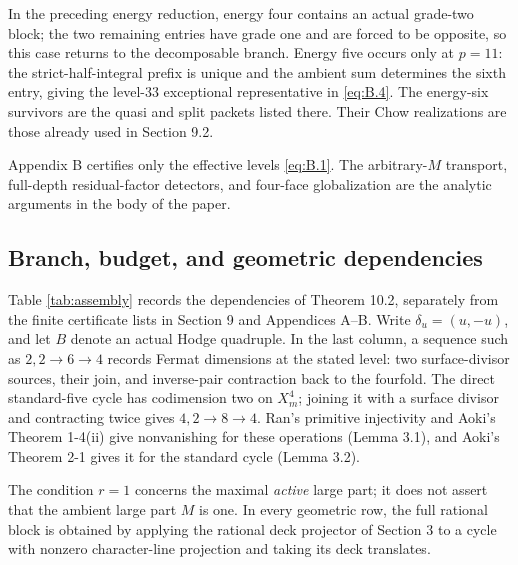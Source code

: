 \documentclass[11pt]{amsart}
\numberwithin{theorem}{section}
\theoremstyle{remark}
\numberwithin{equation}{section}
\begin{document}
In the preceding energy reduction, energy four contains an actual
grade-two block; the two remaining entries have grade one and are forced to
be opposite, so this case returns to the decomposable branch. Energy five
occurs only at \(p=11\): the strict-half-integral prefix is unique and the
ambient sum determines the sixth entry, giving the level-33 exceptional
representative in \eqref{eq:B.4}. The energy-six survivors are the quasi and split
packets listed there. Their Chow realizations are those already used in
Section 9.2.

Appendix B certifies only the effective levels \eqref{eq:B.1}. The arbitrary-\(M\)
transport, full-depth residual-factor detectors, and four-face
globalization are the analytic arguments in the body of the paper.

\begin{landscape}

\section{Branch, budget, and geometric dependencies}\label{sec:appC}

Table \ref{tab:assembly} records the dependencies of Theorem 10.2,
separately from the finite certificate lists in Section 9 and Appendices
A--B. Write \(\delta_u=(u,-u)\), and let \(B\) denote an actual Hodge
quadruple. In the last column, a sequence such as \(2,2\to6\to4\)
records Fermat dimensions at the stated level: two surface-divisor
sources, their join, and inverse-pair contraction back to the fourfold.
The direct standard-five cycle has codimension two on \(X_m^4\);
joining it with a surface divisor and contracting twice gives
\(4,2\to8\to4\). Ran's primitive injectivity and Aoki's
Theorem 1-4(ii) give nonvanishing for these operations (Lemma 3.1),
and Aoki's Theorem 2-1 gives it for the standard cycle (Lemma 3.2).

The condition \(r=1\) concerns the maximal \emph{active} large part; it does
not assert that the ambient large part \(M\) is one. In every geometric
row, the full rational block is obtained by applying the rational deck
projector of Section 3 to a cycle with nonzero character-line projection
and taking its deck translates.


\end{landscape}
\end{document}

